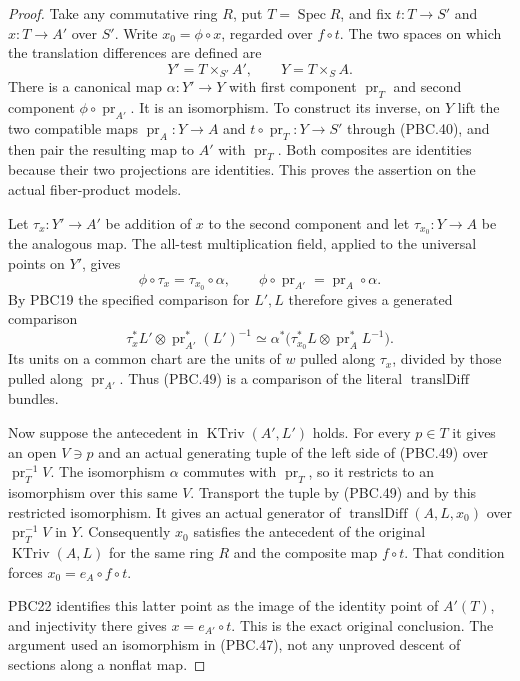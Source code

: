 \begin{proof}
Take any commutative ring $R$, put $T=\operatorname{Spec}R$,
and fix $t:T\to S'$ and $x:T\to A'$ over $S'$.
Write $x_0=\phi\circ x$, regarded over $f\circ t$.
The two spaces on which the translation differences are defined are
\[
 Y'=T\times_{S'}A',\qquad Y=T\times_S A.
                                                        \tag{PBC.47}
\]
There is a canonical map
$\alpha:Y'\to Y$ with first component $\operatorname{pr}_T$
and second component $\phi\circ\operatorname{pr}_{A'}$.
It is an isomorphism.  To construct its inverse, on $Y$ lift
the two compatible maps
$\operatorname{pr}_A:Y\to A$ and
$t\circ\operatorname{pr}_T:Y\to S'$ through (PBC.40), and
then pair the resulting map to $A'$ with $\operatorname{pr}_T$.
Both composites are identities because their two projections
are identities.  This proves the assertion on the actual
fiber-product models.

Let $\tau_x:Y'\to A'$ be addition of $x$ to the second
component and let $\tau_{x_0}:Y\to A$ be the analogous map.
The all-test multiplication field, applied to the universal
points on $Y'$, gives
\[
 \phi\circ\tau_x=\tau_{x_0}\circ\alpha,\qquad
 \phi\circ\operatorname{pr}_{A'}
                         =\operatorname{pr}_A\circ\alpha .
                                                        \tag{PBC.48}
\]
By PBC19 the specified comparison for $L',L$ therefore
gives a generated comparison
\[
 \tau_x^*L'\otimes\operatorname{pr}_{A'}^*(L')^{-1}
 \simeq
 \alpha^*\bigl(
    \tau_{x_0}^*L\otimes\operatorname{pr}_A^*L^{-1}\bigr).
                                                        \tag{PBC.49}
\]
Its units on a common chart are the units of $w$ pulled
along $\tau_x$, divided by those pulled along
$\operatorname{pr}_{A'}$.  Thus (PBC.49) is a comparison
of the literal $\operatorname{translDiff}$ bundles.

Now suppose the antecedent in $\operatorname{KTriv}(A',L')$
holds.  For every $p\in T$ it gives an open $V\ni p$ and
an actual generating tuple of the left side of (PBC.49)
over $\operatorname{pr}_T^{-1}V$.
The isomorphism $\alpha$ commutes with $\operatorname{pr}_T$,
so it restricts to an isomorphism over this same $V$.
Transport the tuple by (PBC.49) and by this restricted
isomorphism.  It gives an actual generator of
$\operatorname{translDiff}(A,L,x_0)$ over
$\operatorname{pr}_T^{-1}V$ in $Y$.
Consequently $x_0$ satisfies the antecedent of the
original $\operatorname{KTriv}(A,L)$ for the same ring
$R$ and the composite map $f\circ t$.
That condition forces $x_0=e_A\circ f\circ t$.

PBC22 identifies this latter point as the image of the
identity point of $A'(T)$, and injectivity there gives
$x=e_{A'}\circ t$.  This is the exact original conclusion.
The argument used an isomorphism in (PBC.47), not any
unproved descent of sections along a nonflat map.
\end{proof}


